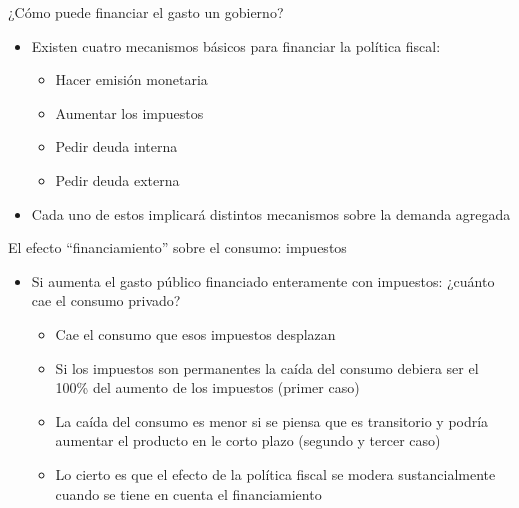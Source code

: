 \documentclass{beamer}
\begin{document}
\begin{frame}{¿Cómo puede financiar el gasto un gobierno?}
    \begin{itemize}
        \item Existen cuatro mecanismos básicos para financiar la política fiscal:
        \begin{itemize}
            \item Hacer emisión monetaria 
            \item Aumentar los impuestos
            \item Pedir deuda interna
            \item Pedir deuda externa 
        \end{itemize}
        \vspace{2mm}
        \item Cada uno de estos implicará distintos mecanismos sobre la demanda agregada
    \end{itemize}
\end{frame}


\begin{frame}{El efecto “financiamiento” sobre el consumo: impuestos}
    
    \begin{itemize}
        \item Si aumenta el gasto público financiado enteramente con impuestos: ¿cuánto cae el consumo privado?
        \begin{itemize}
            \item Cae el consumo que esos impuestos desplazan
            \item Si los impuestos son permanentes la caída del consumo debiera ser el 100\% del aumento de los impuestos (primer caso)
            \item La caída del consumo es menor si se piensa que es transitorio y podría aumentar el producto en le corto plazo (segundo y tercer caso)
            \item Lo cierto es que el efecto de la política fiscal se modera sustancialmente cuando se tiene en cuenta el financiamiento
        \end{itemize}
        \end{itemize}

\end{frame}
\end{document}
